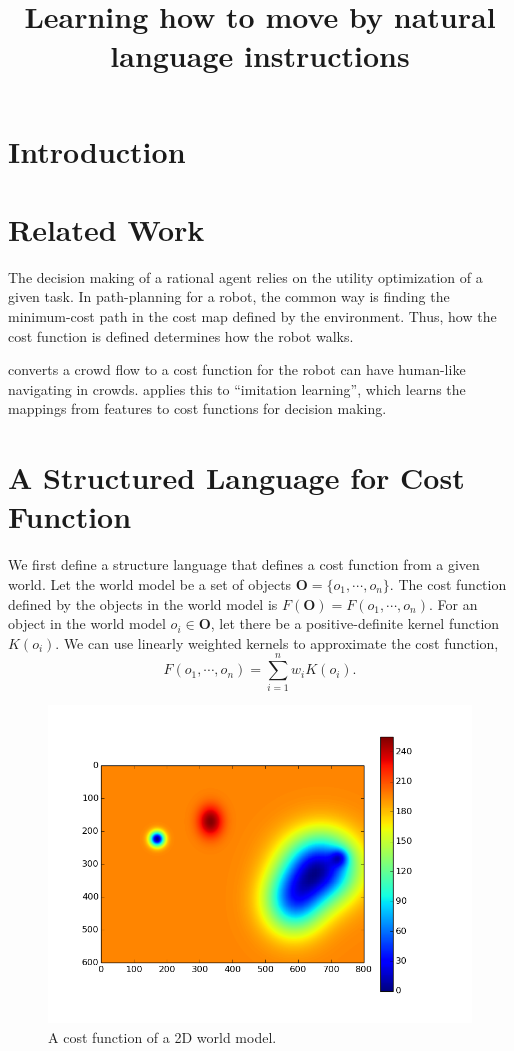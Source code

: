 \documentclass[10pt,a4paper]{article}
\begin{document}
\title{Learning how to move by natural language instructions}	
\author{}
\date{}
\maketitle

\section{Introduction}




\section{Related Work}

The decision making of a rational agent relies on the utility optimization of a given task.
In path-planning for a robot, the common way is finding the minimum-cost path in the cost map defined by the environment.
Thus, how the cost function is defined determines how the robot walks.

\cite{5509772} converts a crowd flow to a cost function for the robot can have human-like navigating in crowds.
\cite{Ratliff:2006:MMP:1143844.1143936} applies this to ``imitation learning'', which learns the mappings from features to cost functions for decision making.

\cite{AAAI159766}

\section{A Structured Language for Cost Function}

We first define a structure language that defines a cost function from a given world.
Let the world model be a set of objects $ \bm{O} = \{ o_1 , \cdots , o_n \} $.
The cost function defined by the objects in the world model is $ F( \bm{O} ) = F( o_1 , \cdots , o_n ) $.
For an object in the world model $ o_i \in \bm{O} $, let there be a positive-definite kernel function $ K( o_i ) $.
We can use linearly weighted kernels to approximate the cost function,
\begin{equation}
\label{eq:kernel_approx}
F( o_1 , \cdots , o_n ) = \sum_{i=1}^{n} w_i K( o_i ).
\end{equation}

\begin{figure}
\centering
\includegraphics[width=0.6\linewidth]{fig/costmap}
\caption{A cost function of a 2D world model.}
\label{fig:costmap}
\end{figure}
\end{document}
